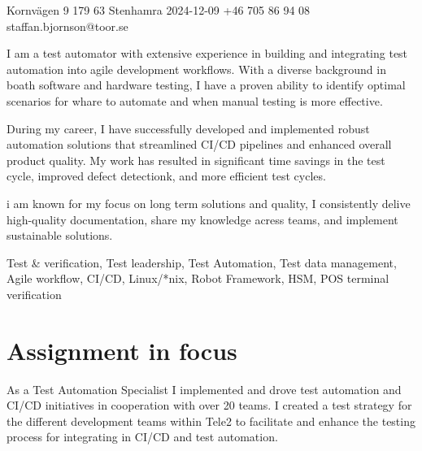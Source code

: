\documentclass{sobCV}[2015/09/08]
\begin{document}
       {Kornvägen 9}
       {179 63 Stenhamra}
       {2024-12-09}
       {+46 705 86 94 08}
       {staffan.bjornson@toor.se}






   {
       I am a test automator with extensive experience in building and
       integrating test automation into agile development workflows. With a
       diverse background in boath software and hardware testing, I have a
       proven ability to identify optimal scenarios for whare to automate and
       when manual testing is more effective. 

       During my career, I have successfully developed and implemented robust
       automation solutions that streamlined CI/CD pipelines and enhanced
       overall product quality. My work has resulted in significant time
       savings in the test cycle, improved defect detectionk, and more
       efficient test cycles.

       i am known for my focus on long term solutions and quality, I
       consistently delive high-quality documentation, share my knowledge
       acress teams, and implement sustainable solutions.
   }{
       Test \& verification,
       Test leadership,
       Test Automation, 
       Test data management,
       Agile workflow,
       CI/CD,
       Linux/*nix,
       Robot Framework,
       HSM,
       POS terminal verification
    }


\section{Assignment in focus}
    As a Test Automation Specialist I implemented and drove test automation and
    CI/CD initiatives in cooperation with over 20 teams. I created a test
    strategy for the different development teams within Tele2 to facilitate and
    enhance the testing process for integrating in CI/CD and test automation.
\end{document}
